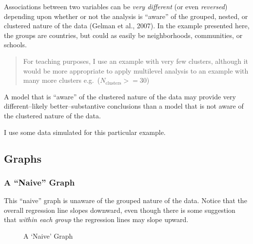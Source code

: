 \documentclass[
  letterpaper,
  DIV=11,
  numbers=noendperiod]{scrreprt}
\begin{document}
Associations between two variables can be \emph{very different} (or even
\emph{reversed}) depending upon whether or not the analysis is ``aware''
of the grouped, nested, or clustered nature of the data (Gelman et al.,
2007). In the example presented here, the groups are countries, but
could as easily be neighborhoods, communities, or schools.

\begin{quote}
For teaching purposes, I use an example with very few clusters, although
it would be more appropriate to apply multilevel analysis to an example
with many more clusters e.g.~(\(N_\text{clusters} >= 30\))
\end{quote}

A model that is ``aware'' of the clustered nature of the data may
provide very different--likely better--substantive conclusions than a
model that is not aware of the clustered nature of the data.

I use some data simulated for this particular example.

\subsection{Graphs}\label{graphs}

\subsubsection{A ``Naive'' Graph}\label{a-naive-graph}

This ``naive'' graph is unaware of the grouped nature of the data.
Notice that the overall regression line slopes downward, even though
there is some suggestion that \emph{within each group} the regression
lines may slope upward.

\begin{figure}


\caption{\label{fig-naive}A `Naive' Graph}

\end{figure}%
\end{document}
